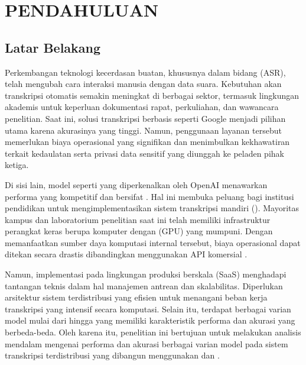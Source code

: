\chapter{PENDAHULUAN}

\section{Latar Belakang}
Perkembangan teknologi kecerdasan buatan, khususnya dalam bidang  (ASR), telah mengubah cara interaksi manusia dengan data suara. Kebutuhan akan transkripsi otomatis semakin meningkat di berbagai sektor, termasuk lingkungan akademis untuk keperluan dokumentasi rapat, perkuliahan, dan wawancara penelitian. Saat ini, solusi transkripsi berbasis  seperti Google  menjadi pilihan utama karena akurasinya yang tinggi. Namun, penggunaan layanan tersebut memerlukan biaya operasional yang signifikan dan menimbulkan kekhawatiran terkait kedaulatan serta privasi data sensitif yang diunggah ke peladen pihak ketiga.

Di sisi lain, model  seperti  yang diperkenalkan oleh OpenAI \cite{radford_robust_nodate} menawarkan performa yang kompetitif dan bersifat . Hal ini membuka peluang bagi institusi pendidikan untuk mengimplementasikan sistem transkripsi mandiri (). Mayoritas kampus dan laboratorium penelitian saat ini telah memiliki infrastruktur perangkat keras berupa komputer dengan  (GPU) yang mumpuni. Dengan memanfaatkan sumber daya komputasi internal tersebut, biaya operasional dapat ditekan secara drastis dibandingkan menggunakan API komersial \cite{fathony_optimisasi_nodate}.

Namun, implementasi  pada lingkungan produksi berskala  (SaaS) menghadapi tantangan teknis dalam hal manajemen antrean dan skalabilitas. Diperlukan arsitektur sistem terdistribusi yang efisien untuk menangani beban kerja transkripsi yang intensif secara komputasi. Selain itu, terdapat berbagai varian model  mulai dari  hingga  yang memiliki karakteristik performa dan akurasi yang berbeda-beda. Oleh karena itu, penelitian ini bertujuan untuk melakukan analisis mendalam mengenai performa dan akurasi berbagai varian model  pada sistem transkripsi terdistribusi yang dibangun menggunakan  dan .


